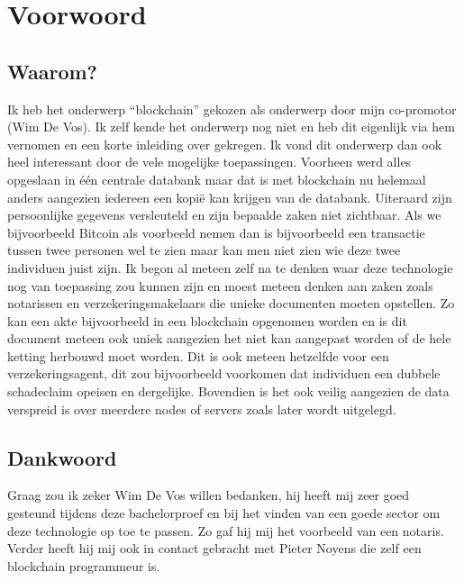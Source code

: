 
\chapter*{Voorwoord}
\label{ch:voorwoord}


\section*{Waarom?}
Ik heb het onderwerp ``blockchain'' gekozen als onderwerp door mijn co-promotor (Wim De Vos). Ik zelf kende het onderwerp nog niet en heb dit eigenlijk via hem vernomen en een korte inleiding over gekregen. Ik vond dit onderwerp dan ook heel interessant door de vele mogelijke toepassingen. Voorheen werd alles opgeslaan in één centrale databank maar dat is met blockchain nu helemaal anders aangezien iedereen een kopië kan krijgen van de databank. Uiteraard zijn persoonlijke gegevens versleuteld en zijn bepaalde zaken niet zichtbaar. Als we bijvoorbeeld Bitcoin als voorbeeld nemen dan is bijvoorbeeld een transactie tussen twee personen wel te zien maar kan men niet zien wie deze twee individuen juist zijn. Ik begon al meteen zelf na te denken waar deze technologie nog van toepassing zou kunnen zijn en moest meteen denken aan zaken zoals notarissen en verzekeringsmakelaars die unieke documenten moeten opstellen. Zo kan een akte bijvoorbeeld in een blockchain opgenomen worden en is dit document meteen ook uniek aangezien het niet kan aangepast worden of de hele ketting herbouwd moet worden. Dit is ook meteen hetzelfde voor een verzekeringsagent, dit zou bijvoorbeeld voorkomen dat individuen een dubbele schadeclaim opeisen en dergelijke. Bovendien is het ook veilig aangezien de data verspreid is over meerdere nodes of servers zoals later wordt uitgelegd.

\newpage
\section*{Dankwoord}
Graag zou ik zeker Wim De Vos willen bedanken, hij heeft mij zeer goed gesteund tijdens deze bachelorproef en bij het vinden van een goede sector om deze technologie op toe te passen. Zo gaf hij mij het voorbeeld van een notaris. Verder heeft hij mij ook in contact gebracht met Pieter Noyens die zelf een blockchain programmeur is.

